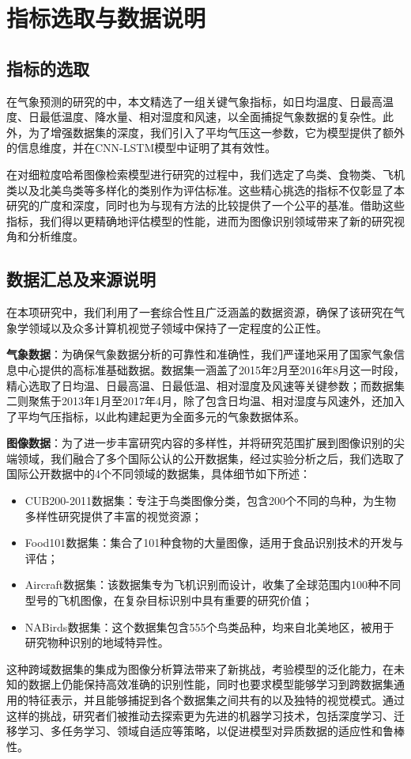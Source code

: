\section{指标选取与数据说明}

\subsection{指标的选取}

在气象预测的研究的中，本文精选了一组关键气象指标，如日均温度、日最高温度、日最低温度、降水量、相对湿度和风速，以全面捕捉气象数据的复杂性。此外，为了增强数据集的深度，我们引入了平均气压这一参数，它为模型提供了额外的信息维度，并在CNN-LSTM模型中证明了其有效性。

在对细粒度哈希图像检索模型进行研究的过程中，我们选定了鸟类、食物类、飞机类以及北美鸟类等多样化的类别作为评估标准。这些精心挑选的指标不仅彰显了本研究的广度和深度，同时也为与现有方法的比较提供了一个公平的基准。借助这些指标，我们得以更精确地评估模型的性能，进而为图像识别领域带来了新的研究视角和分析维度。

\subsection{数据汇总及来源说明}

在本项研究中，我们利用了一套综合性且广泛涵盖的数据资源，确保了该研究在气象学领域以及众多计算机视觉子领域中保持了一定程度的公正性。

\textbf{气象数据}：为确保气象数据分析的可靠性和准确性，我们严谨地采用了国家气象信息中心提供的高标准基础数据。数据集一涵盖了2015年2月至2016年8月这一时段，精心选取了日均温、日最高温、日最低温、相对湿度及风速等关键参数；而数据集二则聚焦于2013年1月至2017年4月，除了包含日均温、相对湿度与风速外，还加入了平均气压指标，以此构建起更为全面多元的气象数据体系。

\textbf{图像数据}：为了进一步丰富研究内容的多样性，并将研究范围扩展到图像识别的尖端领域，我们融合了多个国际公认的公开数据集，经过实验分析之后，我们选取了国际公开数据中的4个不同领域的数据集，具体细节如下所述：
\begin{itemize}[leftmargin=2em]
    \item CUB200-2011数据集：专注于鸟类图像分类，包含200个不同的鸟种，为生物多样性研究提供了丰富的视觉资源；
    \item Food101数据集：集合了101种食物的大量图像，适用于食品识别技术的开发与评估；
    \item Aircraft数据集：该数据集专为飞机识别而设计，收集了全球范围内100种不同型号的飞机图像，在复杂目标识别中具有重要的研究价值；
    \item NABirds数据集：这个数据集包含555个鸟类品种，均来自北美地区，被用于研究物种识别的地域特异性。
\end{itemize}

这种跨域数据集的集成为图像分析算法带来了新挑战，考验模型的泛化能力，在未知的数据上仍能保持高效准确的识别性能，同时也要求模型能够学习到跨数据集通用的特征表示，并且能够捕捉到各个数据集之间共有的以及独特的视觉模式。通过这样的挑战，研究者们被推动去探索更为先进的机器学习技术，包括深度学习、迁移学习、多任务学习、领域自适应等策略，以促进模型对异质数据的适应性和鲁棒性。



